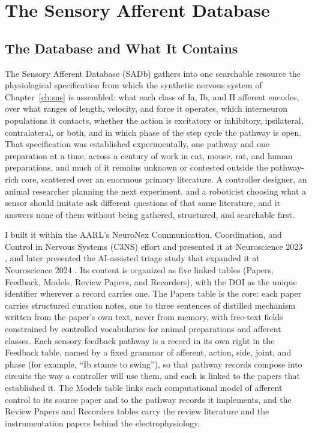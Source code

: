 \chapter{The Sensory Afferent Database}\label{ch:database}
\graphicspath{{D:/Github/Bipedal_Robot/Documentation/Reports and Papers/Dissertation/Figures/50-database/}{figs/50-database/}}

\section{The Database and What It Contains}\label{sec:sadb_resource}

The Sensory Afferent Database (SADb) gathers into one searchable resource the physiological specification from which the synthetic nervous system of Chapter~\ref{ch:sns} is assembled: what each class of Ia, Ib, and II afferent encodes, over what ranges of length, velocity, and force it operates, which interneuron populations it contacts, whether the action is excitatory or inhibitory, ipsilateral, contralateral, or both, and in which phase of the step cycle the pathway is open. That specification was established experimentally, one pathway and one preparation at a time, across a century of work in cat, mouse, rat, and human preparations, and much of it remains unknown or contested outside the pathway-rich core, scattered over an enormous primary literature. A controller designer, an animal researcher planning the next experiment, and a roboticist choosing what a sensor should imitate ask different questions of that same literature, and it answers none of them without being gathered, structured, and searchable first.

I built it within the AARL's NeuroNex Communication, Coordination, and Control in Nervous Systems (C3NS) effort and presented it at Neuroscience 2023 \citep{bolen_sensory_2023}, and later presented the AI-assisted triage study that expanded it at Neuroscience 2024 \citep{bolen_using_2024}. Its content is organized as five linked tables (Papers, Feedback, Models, Review Papers, and Recorders), with the DOI as the unique identifier wherever a record carries one. The Papers table is the core: each paper carries structured curation notes, one to three sentences of distilled mechanism written from the paper's own text, never from memory, with free-text fields constrained by controlled vocabularies for animal preparations and afferent classes. Each sensory feedback pathway is a record in its own right in the Feedback table, named by a fixed grammar of afferent, action, side, joint, and phase (for example, ``Ib stance to swing''), so that pathway records compose into circuits the way a controller will use them, and each is linked to the papers that established it. The Models table links each computational model of afferent control to its source paper and to the pathway records it implements, and the Review Papers and Recorders tables carry the review literature and the instrumentation papers behind the electrophysiology.

